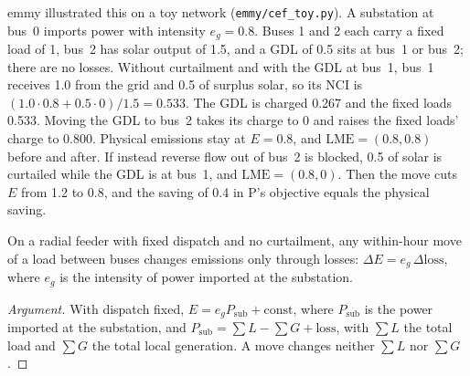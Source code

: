 \documentclass{article}
\begin{document}
emmy illustrated this on a toy network (\texttt{emmy/cef\_toy.py}).
A substation at bus~0 imports power with intensity \(e_g=0.8\).
Buses 1 and 2 each carry a fixed load of 1, bus~2 has solar output of 1.5, and a GDL of 0.5 sits at bus~1 or bus~2; there are no losses.
Without curtailment and with the GDL at bus~1, bus~1 receives 1.0 from the grid and 0.5 of surplus solar, so its NCI is \((1.0\cdot0.8+0.5\cdot0)/1.5=0.533\).
The GDL is charged 0.267 and the fixed loads 0.533.
Moving the GDL to bus~2 takes its charge to 0 and raises the fixed loads' charge to 0.800.
Physical emissions stay at \(E=0.8\), and \(\mathrm{LME}=(0.8,0.8)\) before and after.
If instead reverse flow out of bus~2 is blocked, 0.5 of solar is curtailed while the GDL is at bus~1, and \(\mathrm{LME}=(0.8,0)\).
Then the move cuts \(E\) from 1.2 to 0.8, and the saving of 0.4 in P's objective equals the physical saving.

\begin{proposition}\label{prop:feeder}
On a radial feeder with fixed dispatch and no curtailment, any within-hour move of a load between buses changes emissions only through losses: \(\Delta E=e_g\,\Delta\mathrm{loss}\), where \(e_g\) is the intensity of power imported at the substation.
\end{proposition}

\begin{proof}[Argument]
With dispatch fixed, \(E=e_gP_{\mathrm{sub}}+\text{const}\), where \(P_{\mathrm{sub}}\) is the power imported at the substation, and \(P_{\mathrm{sub}}=\sum L-\sum G+\mathrm{loss}\), with \(\sum L\) the total load and \(\sum G\) the total local generation.
A move changes neither \(\sum L\) nor \(\sum G\).
\end{proof}
\end{document}

